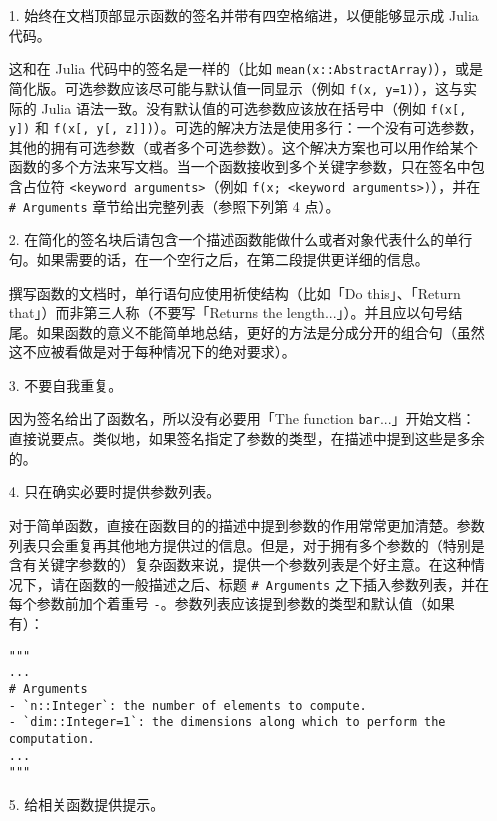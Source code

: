 \begin{itemize}
\item[1.  ] 始终在文档顶部显示函数的签名并带有四空格缩进，以便能够显示成 Julia 代码。

这和在 Julia 代码中的签名是一样的（比如 \texttt{mean(x::AbstractArray)}），或是简化版。可选参数应该尽可能与默认值一同显示（例如 \texttt{f(x, y=1)}），这与实际的 Julia 语法一致。没有默认值的可选参数应该放在括号中（例如 \texttt{f(x[, y])} 和 \texttt{f(x[, y[, z]])}）。可选的解决方法是使用多行：一个没有可选参数，其他的拥有可选参数（或者多个可选参数）。这个解决方案也可以用作给某个函数的多个方法来写文档。当一个函数接收到多个关键字参数，只在签名中包含占位符 \texttt{<keyword arguments>}（例如 \texttt{f(x; <keyword arguments>)}），并在 \texttt{\# Arguments} 章节给出完整列表（参照下列第 4 点）。


\item[2.  ] 在简化的签名块后请包含一个描述函数能做什么或者对象代表什么的单行句。如果需要的话，在一个空行之后，在第二段提供更详细的信息。

撰写函数的文档时，单行语句应使用祈使结构（比如「Do this」、「Return that」）而非第三人称（不要写「Returns the length...」）。并且应以句号结尾。如果函数的意义不能简单地总结，更好的方法是分成分开的组合句（虽然这不应被看做是对于每种情况下的绝对要求）。


\item[3.  ] 不要自我重复。

因为签名给出了函数名，所以没有必要用「The function \texttt{bar}...」开始文档：直接说要点。类似地，如果签名指定了参数的类型，在描述中提到这些是多余的。


\item[4.  ] 只在确实必要时提供参数列表。

对于简单函数，直接在函数目的的描述中提到参数的作用常常更加清楚。参数列表只会重复再其他地方提供过的信息。但是，对于拥有多个参数的（特别是含有关键字参数的）复杂函数来说，提供一个参数列表是个好主意。在这种情况下，请在函数的一般描述之后、标题 \texttt{\# Arguments} 之下插入参数列表，并在每个参数前加个着重号 \texttt{-}。参数列表应该提到参数的类型和默认值（如果有）：


\begin{verbatim}
"""
...
# Arguments
- `n::Integer`: the number of elements to compute.
- `dim::Integer=1`: the dimensions along which to perform the computation.
...
"""
\end{verbatim}


\item[5.  ] 给相关函数提供提示。


\end{itemize}
